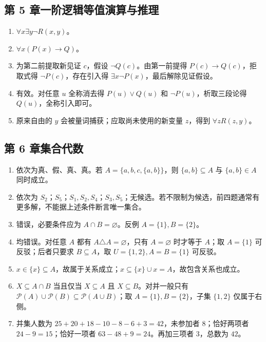 \documentclass[UTF8,fontset=none,zihao=-4,a4paper]{ctexart}
\begin{document}
\subsection*{第 5 章\quad 一阶逻辑等值演算与推理}
\begin{enumerate}[label=5.\arabic*.,leftmargin=2.8em]
\item $\forall x\exists y\neg R(x,y)$。

\item $\forall x(P(x)\to Q)$。

\item 为第二前提取新见证 $c$，假设 $\neg Q(c)$。由第一前提得 $P(c)\to Q(c)$，拒取式得 $\neg P(c)$，存在引入得 $\exists x\neg P(x)$，最后解除见证假设。

\item 有效。对任意 $u$ 全称消去得 $P(u)\lor Q(u)$ 和 $\neg P(u)$，析取三段论得 $Q(u)$，全称引入即可。

\item 原来自由的 $y$ 会被量词捕获；应取尚未使用的新变量 $z$，得到 $\forall zR(z,y)$。
\end{enumerate}

\subsection*{第 6 章\quad 集合代数}
\begin{enumerate}[label=6.\arabic*.,leftmargin=2.8em]
\item 依次为真、假、真、真。若 $A=\{a,b,c,\{a,b\}\}$，则 $\{a,b\}\subseteq A$ 与 $\{a,b\}\in A$ 同时成立。

\item 依次为 $S_2$；$S_5$；$S_1,S_2,S_4$；$S_3,S_5$；无候选。若不限制为候选，前四题通常有更多解，不能据上述条件断言唯一集合。

\item 错误，必要条件应为 $A\cap B=\varnothing$。反例 $A=\{1\},B=\{2\}$。

\item 均错误。对任意 $A$ 都有 $A\triangle A=\varnothing$，只有 $A=\varnothing$ 时才等于 $A$；取 $A=\{1\}$ 可反驳；后者只要求 $B\subseteq A$，取 $U=\{1,2\},A=B=\{1\}$ 可反驳。

\item $x\in\{x\}\subseteq A$，故属于关系成立；$x\subseteq\{x\}\cup x=A$，故包含关系也成立。

\item $X\subseteq A\cap B$ 当且仅当 $X\subseteq A$ 且 $X\subseteq B$。对并一般只有 $\mathcal P(A)\cup\mathcal P(B)\subseteq\mathcal P(A\cup B)$；取 $A=\{1\},B=\{2\}$，子集 $\{1,2\}$ 仅属于右侧。

\item 并集人数为 $25+20+18-10-8-6+3=42$，未参加者 $8$；恰好两项者 $24-9=15$；恰好一项者 $63-48+9=24$。再加三项者 $3$，总数为 $42$。
\end{enumerate}
\end{document}
